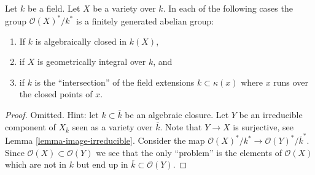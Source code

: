 \begin{lemma}
\label{lemma-units-variety}
Let $k$ be a field.
Let $X$ be a variety over $k$.
In each of the following cases the group $\mathcal{O}(X)^*/k^*$
is a finitely generated abelian group:
\begin{enumerate}
\item If $k$ is algebraically closed in $k(X)$,
\item if $X$ is geometrically integral over $k$, and
\item if $k$ is the ``intersection'' of the field extensions
$k \subset \kappa(x)$ where $x$ runs over the closed points of $x$.
\end{enumerate}
\end{lemma}

\begin{proof}
Omitted. Hint: let $k \subset \overline{k}$ be an algebraic closure.
Let $Y$ be an irreducible component of $X_{\overline{k}}$ seen as
a variety over $\overline{k}$. Note that $Y \to X$ is surjective, see
Lemma \ref{lemma-image-irreducible}.
Consider the map
$\mathcal{O}(X)^*/k^* \to \mathcal{O}(Y)^*/\overline{k}^*$.
Since $\mathcal{O}(X) \subset \mathcal{O}(Y)$ we see that the
only ``problem'' is the elements of $\mathcal{O}(X)$ which
are not in $k$ but end up in $\overline{k} \subset \mathcal{O}(Y)$.
\end{proof}










